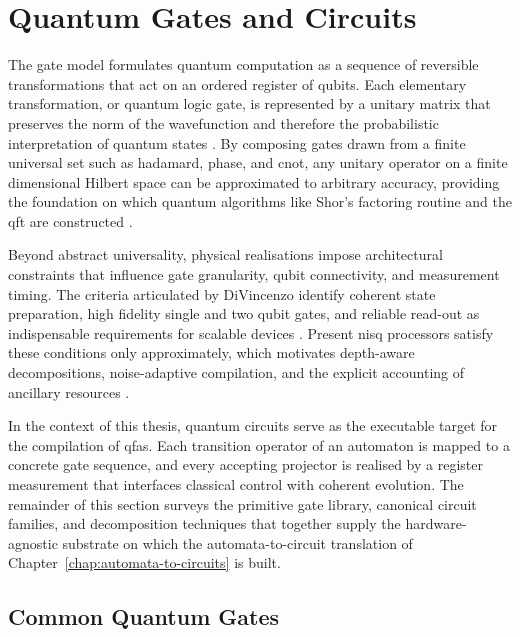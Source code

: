 \section{Quantum Gates and Circuits}
\label{sec:quantum-gates-and-circuits}

The gate model formulates quantum computation as a sequence of reversible transformations that act on an ordered register of qubits. Each elementary transformation, or quantum logic gate, is represented by a unitary matrix that preserves the norm of the wavefunction and therefore the probabilistic interpretation of quantum states \cite{nielsen2005geometric}. By composing gates drawn from a finite universal set such as \gls{hadamard}, \gls{phase}, and \gls{cnot}, any unitary operator on a finite dimensional Hilbert space can be approximated to arbitrary accuracy, providing the foundation on which quantum algorithms like Shor's factoring routine and the \gls{qft} are constructed \cite{weinberg1995quantum,shor1994algorithms}.

Beyond abstract universality, physical realisations impose architectural constraints that influence gate granularity, qubit connectivity, and measurement timing. The criteria articulated by DiVincenzo identify coherent state preparation, high fidelity single and two qubit gates, and reliable read-out as indispensable requirements for scalable devices \cite{divincenzo2000physical}. Present \gls{nisq} processors satisfy these conditions only approximately, which motivates depth-aware decompositions, noise-adaptive compilation, and the explicit accounting of ancillary resources \cite{preskill2018quantum}. 

In the context of this thesis, quantum circuits serve as the executable target for the compilation of \glspl{qfa}. Each transition operator of an automaton is mapped to a concrete gate sequence, and every accepting projector is realised by a register measurement that interfaces classical control with coherent evolution. The remainder of this section surveys the primitive gate library, canonical circuit families, and decomposition techniques that together supply the hardware-agnostic substrate on which the automata-to-circuit translation of Chapter~\ref{chap:automata-to-circuits} is built.

\subsection{Common Quantum Gates}
\label{sec:common-quantum-gates}

